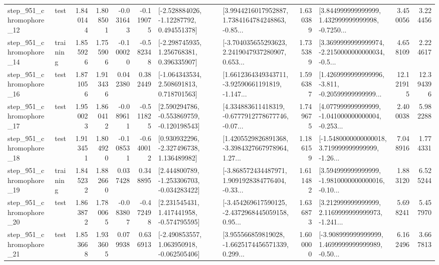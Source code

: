 \begin{tabular}{llrrrrllrlrr}
  step\_951\_chromophore\_12 &      test &      1.840144 &    1.808501 &     -0.031643 & -0.119075 &    [-2.528884026, -1.12287792, 0.494551378] &  [3.9944216017952887, 1.7384164784248863, -0.85... &       1.630389 &  [3.844999999999999, 1.432999999999998, -0.7250... &            3.450056 &          3.224456 \\
  step\_951\_chromophore\_14 &  training &      1.855926 &    1.755906 &     -0.100020 & -0.582348 &    [-2.298745935, 1.256768381, 0.396335907] &  [-3.704035655293623, 2.2419047937280907, 0.653... &       1.735389 &  [3.3699999999999974, -2.2150000000000034, -0.5... &            4.658109 &          2.224617 \\
  step\_951\_chromophore\_16 &      test &      1.871056 &    1.913436 &      0.042380 &  0.382449 &    [-1.064343534, 2.508691813, 0.718701563] &  [1.6612364349343711, -3.92590661191819, -1.147... &       1.596387 &  [1.4269999999999996, -3.811, -0.20599999999999... &           12.121915 &         12.394396 \\
  step\_951\_chromophore\_17 &      test &      1.950023 &    1.860412 &     -0.089611 & -0.511825 &   [2.590294786, -0.553869759, -0.120198543] &  [4.334883611418319, -0.6777912778677746, -0.07... &       1.749675 &  [4.077999999999999, -1.041000000000004, -0.253... &            2.400038 &          5.982288 \\
  step\_951\_chromophore\_18 &      test &      1.913451 &    1.804920 &     -0.108531 & -0.640012 &    [0.930932296, -2.327496738, 1.136489982] &  [1.4205529826891368, -3.3984327667978964, 1.27... &       1.186159 &  [-1.5480000000000018, 3.719999999999999, -1.26... &            7.048916 &          1.774331 \\
  step\_951\_chromophore\_19 &  training &      1.845232 &    1.882660 &      0.037428 &  0.348895 &   [2.444800789, -1.253306703, -0.034283422] &  [-3.868572434487971, 1.9091928384776404, -0.33... &       1.611482 &  [3.594999999999999, -1.9810000000000016, -0.10... &            1.883120 &          6.525244 \\
  step\_951\_chromophore\_20 &      test &      1.863872 &    1.780065 &     -0.083807 & -0.472498 &    [2.231545431, 1.417441958, -0.574795595] &  [-3.454269617590125, -2.4372968445059158, 0.95... &       1.636873 &  [3.212999999999999, 2.1169999999999973, -1.241... &            5.698241 &          5.457970 \\
  step\_951\_chromophore\_21 &      test &      1.853668 &    1.933605 &      0.079938 &  0.636913 &   [-2.490853557, 1.063950918, -0.062505406] &  [3.955566859819028, -1.6625174456571339, 0.299... &       1.600000 &  [-3.908999999999999, 1.4699999999999989, -0.50... &            6.162496 &          3.667813 \\

\end{tabular}
